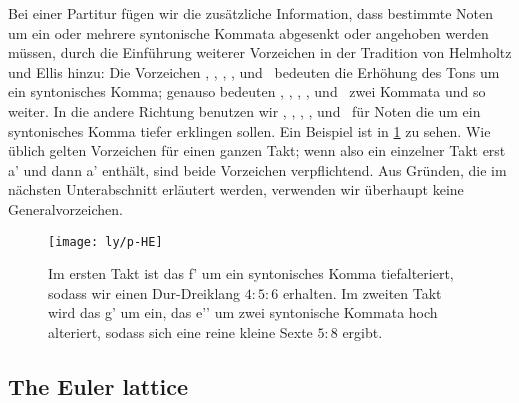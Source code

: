 \documentclass[ngerman,11pt]{scrartcl}
\begin{document}
Bei einer Partitur fügen wir die zusätzliche Information, dass bestimmte Noten
um ein oder mehrere syntonische Kommata abgesenkt oder angehoben werden müssen,
durch die Einführung weiterer Vorzeichen in der Tradition von Helmholtz und
Ellis \cite{HE} hinzu: Die Vorzeichen \dsharpp, \sharpp, \naturalp, \flatp, und
\dflatp\ bedeuten die Erhöhung des Tons um ein syntonisches Komma; genauso
bedeuten \dsharpp, \sharppp, \naturalpp, \flatpp, und \dflatpp\ zwei Kommata und
so weiter. In die andere Richtung benutzen wir \dsharpm, \sharpm, \naturalm,
\flatm, und \dflatm\ für Noten die um ein syntonisches Komma tiefer erklingen
sollen. Ein Beispiel ist in \cref{fig:HE} zu sehen. Wie üblich gelten Vorzeichen
für einen ganzen Takt; wenn also ein einzelner Takt erst \naturalm a' und dann
\natural a' enthält, sind beide Vorzeichen verpflichtend. Aus Gründen, die im
nächsten Unterabschnitt erläutert werden, verwenden wir überhaupt keine
Generalvorzeichen.

\begin{figure}\centering
  \texttt{[image: ly/p-HE]}
  \caption{Im ersten Takt ist das \sharp f’ um ein syntonisches Komma 
    tiefalteriert, sodass wir einen Dur-Dreiklang $4:5:6$ erhalten. Im zweiten
    Takt wird das g’ um ein, das \flat e’’ um zwei syntonische Kommata hoch
    alteriert, sodass sich eine reine kleine Sexte $5:8$ ergibt.}\label{fig:HE}
\end{figure}

\subsection{The Euler lattice}
\end{document}
